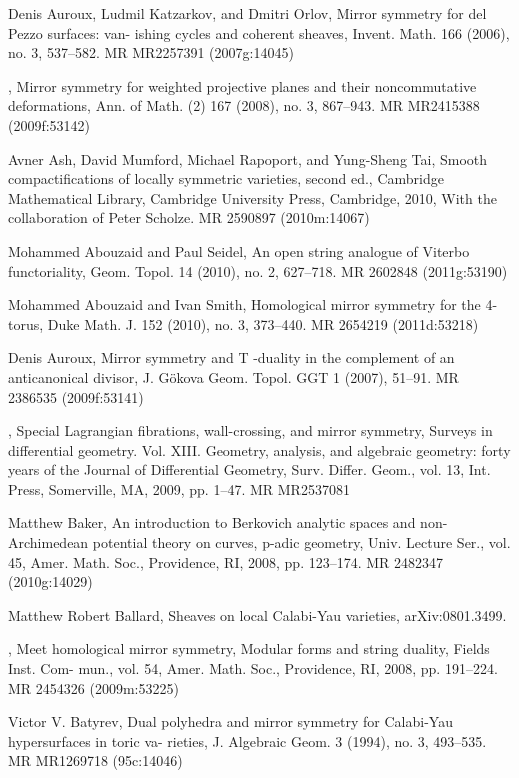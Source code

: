 {\begin{list}{}{%
  \setlength{\leftmargin}{3.4em}%
  \setlength{\itemindent}{-3.4em}%
  \setlength{\itemsep}{1.5pt}%
  \setlength{\parsep}{0pt}%
  \setlength{\listparindent}{0pt}%
}
\item[{[AKO06]}] Denis Auroux, Ludmil Katzarkov, and Dmitri Orlov, Mirror symmetry for del Pezzo surfaces: van- ishing cycles and coherent sheaves, Invent. Math. 166 (2006), no. 3, 537--582. MR MR2257391 (2007g:14045)
\item[{[AKO08]}] , Mirror symmetry for weighted projective planes and their noncommutative deformations, Ann. of Math. (2) 167 (2008), no. 3, 867--943. MR MR2415388 (2009f:53142)
\item[{[AMRT10]}] Avner Ash, David Mumford, Michael Rapoport, and Yung-Sheng Tai, Smooth compactifications of locally symmetric varieties, second ed., Cambridge Mathematical Library, Cambridge University Press, Cambridge, 2010, With the collaboration of Peter Scholze. MR 2590897 (2010m:14067)
\item[{[AS10a]}] Mohammed Abouzaid and Paul Seidel, An open string analogue of Viterbo functoriality, Geom. Topol. 14 (2010), no. 2, 627--718. MR 2602848 (2011g:53190)
\item[{[AS10b]}] Mohammed Abouzaid and Ivan Smith, Homological mirror symmetry for the 4-torus, Duke Math. J. 152 (2010), no. 3, 373--440. MR 2654219 (2011d:53218)
\item[{[Aur07]}] Denis Auroux, Mirror symmetry and T -duality in the complement of an anticanonical divisor, J. Gökova Geom. Topol. GGT 1 (2007), 51--91. MR 2386535 (2009f:53141)
\item[{[Aur09]}] , Special Lagrangian fibrations, wall-crossing, and mirror symmetry, Surveys in differential geometry. Vol. XIII. Geometry, analysis, and algebraic geometry: forty years of the Journal of Differential Geometry, Surv. Differ. Geom., vol. 13, Int. Press, Somerville, MA, 2009, pp. 1--47. MR MR2537081
\item[{[Bak08]}] Matthew Baker, An introduction to Berkovich analytic spaces and non-Archimedean potential theory on curves, p-adic geometry, Univ. Lecture Ser., vol. 45, Amer. Math. Soc., Providence, RI, 2008, pp. 123--174. MR 2482347 (2010g:14029)
\item[{[Bal]}] Matthew Robert Ballard, Sheaves on local Calabi-Yau varieties, arXiv:0801.3499.
\item[{[Bal08]}] , Meet homological mirror symmetry, Modular forms and string duality, Fields Inst. Com- mun., vol. 54, Amer. Math. Soc., Providence, RI, 2008, pp. 191--224. MR 2454326 (2009m:53225)
\item[{[Bat94]}] Victor V. Batyrev, Dual polyhedra and mirror symmetry for Calabi-Yau hypersurfaces in toric va- rieties, J. Algebraic Geom. 3 (1994), no. 3, 493--535. MR MR1269718 (95c:14046)

\end{list}}
